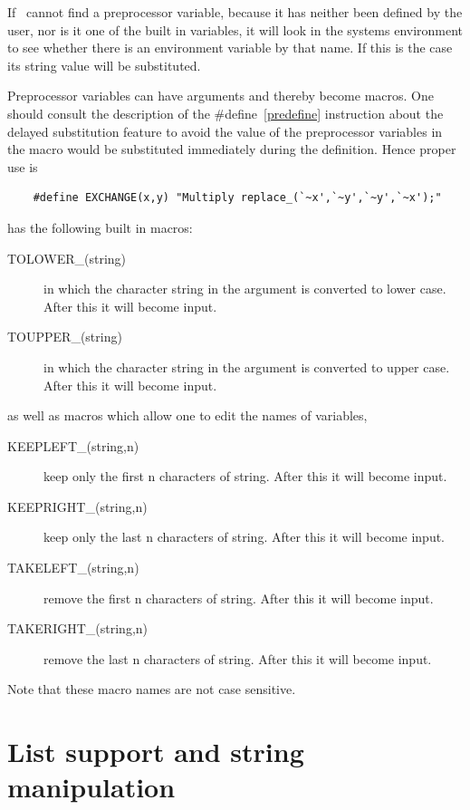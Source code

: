 \noindent If \FORM\ cannot find a preprocessor variable, because it has 
neither been defined by the user, nor is it one of the built in variables, 
it will look in the systems environment to see whether 
there is an environment variable by that name. If this is the case its 
string value will be substituted.

\noindent Preprocessor variables can have arguments and thereby become 
macros. One should consult the description of the \#define~\ref{predefine} 
instruction about the delayed substitution feature to avoid the value of 
the preprocessor variables in the macro would be substituted immediately 
during the definition. Hence proper use is
\begin{verbatim}
    #define EXCHANGE(x,y) "Multiply replace_(`~x',`~y',`~y',`~x');"
\end{verbatim}

\noindent \FORM{} has the following built in macros:
\begin{description}
\item[TOLOWER\_(string)] in which the character string in the argument is 
converted to lower case. After this it will become input.
\item[TOUPPER\_(string)] in which the character string in the argument is 
converted to upper case. After this it will become input.
\end{description}
as well as macros which allow one to edit the names of variables,
\begin{description}
\item[KEEPLEFT\_(string,n)] keep only the first n characters of string.
After this it will become input.
\item[KEEPRIGHT\_(string,n)] keep only the last n characters of string.
After this it will become input.
\item[TAKELEFT\_(string,n)] remove the first n characters of string.
After this it will become input.
\item[TAKERIGHT\_(string,n)] remove the last n characters of string.
After this it will become input.
\end{description}
Note that these macro names are not case sensitive.


\section{List support and string manipulation}
\label{listmanipulation}

